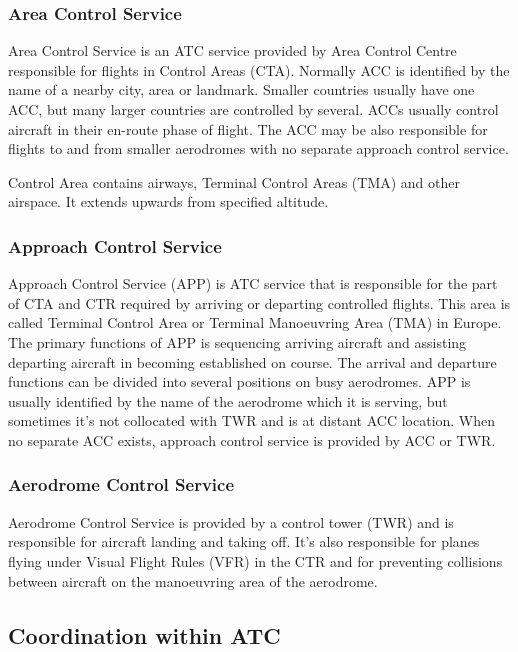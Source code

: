 \subsubsection{Area Control Service}

Area Control Service is an ATC service provided by Area Control Centre responsible for flights in Control Areas (CTA). Normally ACC is identified by the name of a nearby city, area or landmark. Smaller countries usually have one ACC, but many larger countries are controlled by several. ACCs usually control aircraft in their en-route phase of flight. The ACC may be also responsible for flights to and from smaller aerodromes with no separate approach control service. \cite[Chapter 3.2]{annex11}

Control Area contains airways, Terminal Control Areas (TMA) and other airspace. It extends upwards from specified altitude.

\subsubsection{Approach Control Service}

Approach Control Service (APP) is ATC service that is responsible for the part of CTA and CTR required by arriving or departing controlled flights. This area is called Terminal Control Area or Terminal Manoeuvring Area (TMA) in Europe. The primary functions of APP is sequencing arriving aircraft and assisting departing aircraft in becoming established on course. The arrival and departure functions can be divided into several positions on busy aerodromes. APP is usually identified by the name of the aerodrome which it is serving, but sometimes it's not collocated with TWR and is at distant ACC location. When no separate ACC exists, approach control service is provided by ACC or TWR. \cite[Chapter 3.2]{annex11}

\subsubsection{Aerodrome Control Service}

Aerodrome Control Service is provided by a control tower (TWR) and is responsible for aircraft landing and taking off. It's also responsible for planes flying under Visual Flight Rules (VFR) in the CTR and for preventing collisions between aircraft on the manoeuvring area of the aerodrome. \cite[Chapter 3.2]{annex11}

\subsection{Coordination within ATC}

